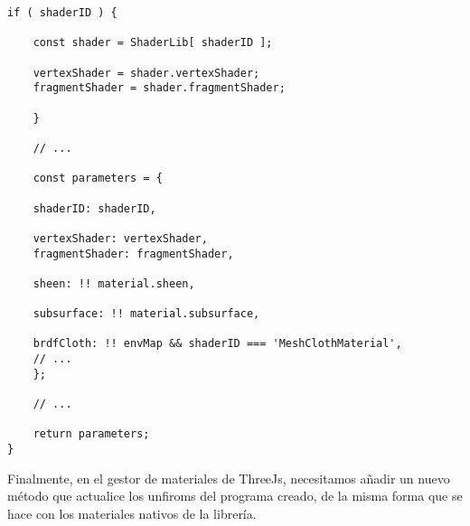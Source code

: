 \begin{lstlisting}[caption=Clase MeshClothMaterial]
    if ( shaderID ) {

    const shader = ShaderLib[ shaderID ];

    vertexShader = shader.vertexShader;
    fragmentShader = shader.fragmentShader;

    }

    // ...

    const parameters = {

    shaderID: shaderID,

    vertexShader: vertexShader,
    fragmentShader: fragmentShader,

    sheen: !! material.sheen,

    subsurface: !! material.subsurface,

    brdfCloth: !! envMap && shaderID === 'MeshClothMaterial',
    // ...
    };

    // ...

    return parameters;
}
    \end{lstlisting}

    Finalmente, en el gestor de materiales de ThreeJs, necesitamos a\~nadir un nuevo m\'etodo
    que actualice los unfiroms del programa creado, de la misma forma que se hace con los
    materiales nativos de la librer\'ia.\newline
    
